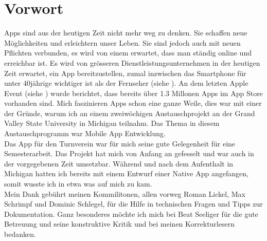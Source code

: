\chapter*{Vorwort}\label{vorwort}
Apps sind aus der heutigen Zeit nicht mehr weg zu denken. Sie schaffen neue Möglichkeiten und erleichtern unser Leben. Sie sind jedoch auch mit neuen Pflichten verbunden, es wird von einem erwartet, dass man ständig online und erreichbar ist. Es wird von grösseren Dienstleistungsunternehmen in der heutigen Zeit erwartet, ein App bereitzustellen, zumal inzwischen das Smartphone für unter 40jährige wichtiger ist als der Fernseher (siehe \cite{digitalisierungsbericht2014}). An dem letzten Apple Event (siehe \cite{apple_event_sept_2014}) wurde berichtet, dass bereits über 1.3 Millonen Apps im App Store vorhanden sind. Mich faszinieren Apps schon eine ganze Weile, dies war mit einer der Gründe, warum ich an einem zweiwöchigen Austauschprojekt an der Grand Valley State University in Michigan teilnahm. Das Thema in diesem Austauschprogramm war Mobile App Entwicklung.\\

Das App für den Turnverein war für mich seine gute Gelegenheit für eine Semesterarbeit. Das Projekt hat mich von Anfang an gefesselt und war auch in der vorgegebenen Zeit umsetzbar. Während und nach dem Aufenthalt in Michigan hatten ich bereits mit einem Entwurf einer Native App angefangen, somit wusste ich in etwa was auf mich zu kam.\\

Mein Dank gebührt meinen Kommilitonen, allen vorweg Roman Lickel, Max Schrimpf und Dominic Schlegel, für die Hilfe in technischen Fragen und Tipps zur Dokumentation. Ganz besonderes möchte ich mich bei Beat Seeliger für die gute Betreuung und seine konstruktive Kritik und bei meinen Korrekturlesern bedanken.
